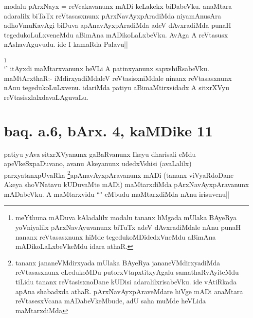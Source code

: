 \begin{artha}
modalu pArxNayx = reVcakavanunx mADi keLakekx biDabeVku. anaMtara 
adaralilx biTaTx reVtasasxnunx pArxNavAyxpAradiMda niyamAnusAra 
adhoVmuKavAgi biDuva apAnavAyxpAradiMda adeV dAvxradiMda punaH 
tegedukoLuLxveneMdu aBimAna mADikoLaLxbeVku. AvAga A reVtasusx 
nAshavAguvudu. ide I kamaRda Palavu||
\end{artha}


\begin{artha}
\footnote[1]{meYthuna mADuva kAladalilx modalu tananx liMgada mUlaka 
BAyeRya yoVniyalilx pArxNavAyuvanunx biTuTx adeV dAvxradiMdale nAnu 
punaH nananx reVtasasxnunx hiMde tegedukoMDidedxVneMdu aBimAna 
mADikoLaLxbeVkeMdu idara athaR.}\\
`\stext' itAyxdi maMtarxvanunx heVLi A patinxyanunx sapxshiRsabeVku. 
maMtArxthaR:- iMdirxyadiMdaleV reVtasisxniMdale ninanx reVtasasxnunx 
nAnu tegedukoLuLxvenu. idariMda patiyu aBimaMtirxsidadx A sitxrXVyu 
reVtasisxlalxdavaLAguvaLu.
\end{artha}

\section*{baq. a.6, bArx. 4, kaMDike 11}

\stext


\begin{artha}
patiyu yAva sitxrXVyanunx gaBaRvanunx Ikeyu dharisali eMdu 
apeVkeSxpaDuvano, avanu Akeyanunx udedxVshisi (avaLalilx) 
parxyatanxpUvaRka \footnote[2]{tananx jananeVMdirxyada mUlaka BAyeRya 
jananeVMdirxyadiMda reVtasasxnunx eLedukoMDu putorxVtapxtitxyAgalu 
samathaRvAyiteMdu tiLidu tananx reVtasisxnoDane kUDisi 
adaralilxrisabeVku. ide vAtiRkada apAna shabadxda athaR. 
pArxNavAyxpAraveMdare hiVge mADi anaMtara reVtasesxVcana 
mADabeVkeMbude, adU saha muMde heVLida maMtarxdiMda}apAnavAyxpAravanunx mADi (tananx 
viVyaRdoDane Akeya shoVNatavu kUDuvaMte mADi) maMtarxdiMda 
pArxNavAyxpAravanunx mADabeVku. A maMtarxvidu ``\stext" eMbudu 
maMtarxdiMda nAnu irisuvenu||
\end{artha}


